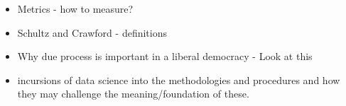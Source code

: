 \documentclass[12pt]{article} %
\begin{document}

















\newpage



\newpage
{}
\begin{itemize}
\item Metrics - how to measure?
\item Schultz and Crawford - definitions
\item Why due process is important in a liberal democracy - Look at this
\item incursions of data science into the methodologies and procedures and how they may challenge the meaning/foundation of these.
\end{itemize}
\end{document}
